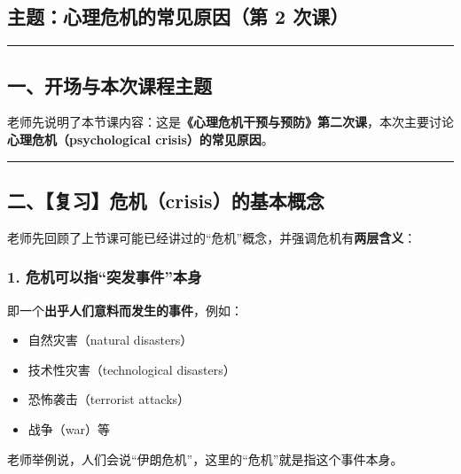 \documentclass[
  chinese,
  9pt,
  a4paper,
]{ctexart}
\providecommand{\tightlist}{%
  \setlength{\itemsep}{0pt}\setlength{\parskip}{0pt}}
\begin{document}
\subsection{主题：心理危机的常见原因（第 2
次课）}\label{ux4e3bux9898ux5fc3ux7406ux5371ux673aux7684ux5e38ux89c1ux539fux56e0ux7b2c-2-ux6b21ux8bfe}

\begin{center}\rule{0.5\linewidth}{0.5pt}\end{center}

\subsection{一、开场与本次课程主题}\label{ux4e00ux5f00ux573aux4e0eux672cux6b21ux8bfeux7a0bux4e3bux9898}

老师先说明了本节课内容：这是\textbf{《心理危机干预与预防》第二次课}，本次主要讨论\textbf{心理危机（psychological
crisis）的常见原因}。

\begin{center}\rule{0.5\linewidth}{0.5pt}\end{center}

\subsection{二、【复习】危机（crisis）的基本概念}\label{ux4e8cux590dux4e60ux5371ux673acrisisux7684ux57faux672cux6982ux5ff5}

老师先回顾了上节课可能已经讲过的``危机''概念，并强调危机有\textbf{两层含义}：

\subsubsection{1.
危机可以指``突发事件''本身}\label{ux5371ux673aux53efux4ee5ux6307ux7a81ux53d1ux4e8bux4ef6ux672cux8eab}

即一个\textbf{出乎人们意料而发生的事件}，例如：

\begin{itemize}
\tightlist
\item
  自然灾害（natural disasters）
\item
  技术性灾害（technological disasters）
\item
  恐怖袭击（terrorist attacks）
\item
  战争（war）等
\end{itemize}

老师举例说，人们会说``伊朗危机''，这里的``危机''就是指这个事件本身。
\end{document}
